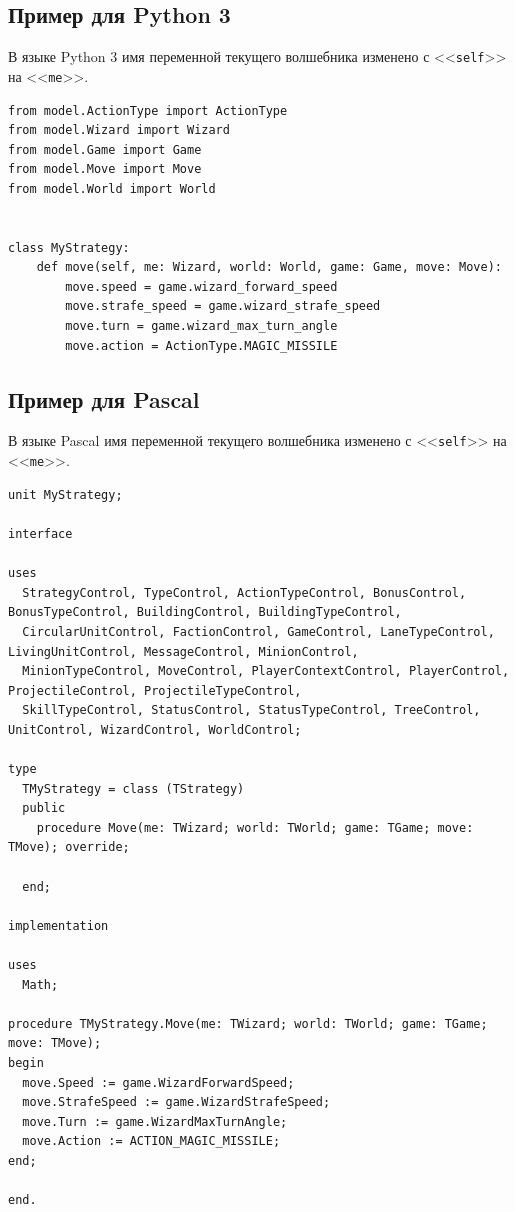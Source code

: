 \subsection{Пример для Python 3}

В языке Python 3 имя переменной текущего волшебника изменено с <<\texttt{self}>> на <<\texttt{me}>>.

\begin{verbatim}
from model.ActionType import ActionType
from model.Wizard import Wizard
from model.Game import Game
from model.Move import Move
from model.World import World


class MyStrategy:
    def move(self, me: Wizard, world: World, game: Game, move: Move):
        move.speed = game.wizard_forward_speed
        move.strafe_speed = game.wizard_strafe_speed
        move.turn = game.wizard_max_turn_angle
        move.action = ActionType.MAGIC_MISSILE
\end{verbatim}

\newpage
\subsection{Пример для Pascal}

В языке Pascal имя переменной текущего волшебника изменено с <<\texttt{self}>> на <<\texttt{me}>>.

\begin{verbatim}
unit MyStrategy;

interface

uses
  StrategyControl, TypeControl, ActionTypeControl, BonusControl, BonusTypeControl, BuildingControl, BuildingTypeControl,
  CircularUnitControl, FactionControl, GameControl, LaneTypeControl, LivingUnitControl, MessageControl, MinionControl,
  MinionTypeControl, MoveControl, PlayerContextControl, PlayerControl, ProjectileControl, ProjectileTypeControl,
  SkillTypeControl, StatusControl, StatusTypeControl, TreeControl, UnitControl, WizardControl, WorldControl;

type
  TMyStrategy = class (TStrategy)
  public
    procedure Move(me: TWizard; world: TWorld; game: TGame; move: TMove); override;

  end;

implementation

uses
  Math;
    
procedure TMyStrategy.Move(me: TWizard; world: TWorld; game: TGame; move: TMove);
begin
  move.Speed := game.WizardForwardSpeed;
  move.StrafeSpeed := game.WizardStrafeSpeed;
  move.Turn := game.WizardMaxTurnAngle;
  move.Action := ACTION_MAGIC_MISSILE;
end;

end.
\end{verbatim}

